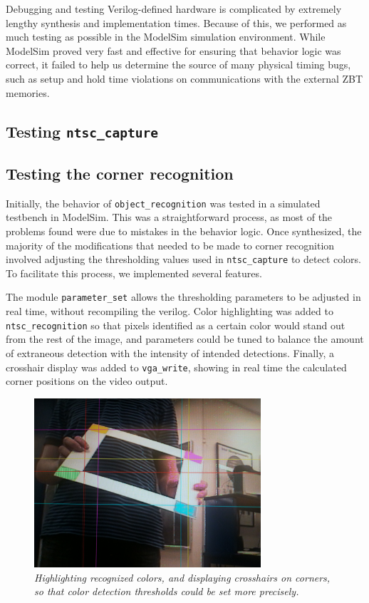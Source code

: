 \documentclass[10pt]{article}
\begin{document}
{Debugging and testing Verilog-defined hardware is complicated by extremely lengthy synthesis and implementation times. Because of this, we performed as much testing as possible in the ModelSim simulation environment. While ModelSim proved very fast and effective for ensuring that behavior logic was correct, it failed to help us determine the source of many physical timing bugs, such as setup and hold time violations on communications with the external ZBT memories.

\subsection{Testing {\tt ntsc\_capture}}



\subsection{Testing the corner recognition}

Initially, the behavior of {\tt object\_recognition} was tested in a simulated testbench in ModelSim. This was a straightforward process, as most of the problems found were due to mistakes in the behavior logic. Once synthesized, the majority of the modifications that needed to be made to corner recognition involved adjusting the thresholding values used in {\tt ntsc\_capture} to detect colors. To facilitate this process, we implemented several features.

The module {\tt parameter\_set} allows the thresholding parameters to be adjusted in real time, without recompiling the verilog. Color highlighting was added to {\tt ntsc\_recognition} so that pixels identified as a certain color would stand out from the rest of the image, and parameters could be tuned to balance the amount of extraneous detection with the intensity of intended detections. Finally, a crosshair display was added to {\tt vga\_write}, showing in real time the calculated corner positions on the video output.

\begin{figure}[h!]
\centering
\includegraphics[width=0.75\textwidth]{images/IMG_0131.JPG}
\caption{\emph{Highlighting recognized colors, and displaying crosshairs on corners, so that color detection thresholds could be set more precisely.}}
\end{figure}

}
\end{document}
